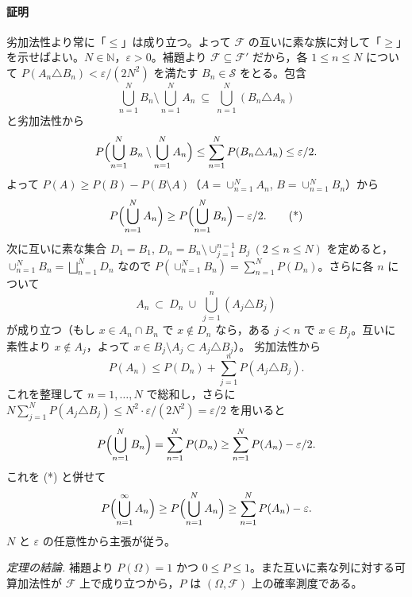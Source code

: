 \documentclass[uplatex,dvipdfmx,11pt,a4paper,openany]{bxjsbook}
\begin{document}
\paragraph{証明}
劣加法性より常に「\(\le\)」は成り立つ。よって \(\mathcal{F}\) の互いに素な族に対して「\(\ge\)」を示せばよい。\(N\in\mathbb{N}\)，\(\varepsilon>0\)。補題より \(\mathcal{F}\subseteq\mathcal{F}'\) だから，各 \(1\le n\le N\) について
                        \(P(A_n\triangle B_n)<\varepsilon/(2N^2)\) を満たす \(B_n\in\mathcal{S}\) をとる。包含
                        \[\bigcup_{n=1}^N B_n\setminus \bigcup_{n=1}^N A_n\ \subseteq\ \bigcup_{n=1}^N (B_n\triangle A_n)\]
                        と劣加法性から
                        \[P\Bigl(\bigcup_{n=1}^N B_n\setminus \bigcup_{n=1}^N A_n\Bigr)\le \sum_{n=1}^N P(B_n\triangle A_n)\le \varepsilon/2.\]
                        よって \(P(A)\ge P(B)-P(B\setminus A)\)（\(A=\cup_{n=1}^N A_n\), \(B=\cup_{n=1}^N B_n\)）から
                        \[P\Bigl(\bigcup_{n=1}^N A_n\Bigr)\ge P\Bigl(\bigcup_{n=1}^N B_n\Bigr)-\varepsilon/2.\tag{*}\]
                        次に互いに素な集合 \(D_1=B_1\), \(D_n=B_n\setminus \cup_{j=1}^{n-1}B_j\ (2\le n\le N)\) を定めると，\(\cup_{n=1}^N B_n=\bigsqcup_{n=1}^N D_n\) なので
                        \(P(\cup_{n=1}^N B_n)=\sum_{n=1}^N P(D_n)\)。さらに各 \(n\) について
                        \[A_n\ \subset\ D_n\ \cup\ \bigcup_{j=1}^{n}(A_j\triangle B_j)\]
                        が成り立つ（もし \(x\in A_n\cap B_n\) で \(x\notin D_n\) なら，ある \(j<n\) で \(x\in B_j\)。互いに素性より \(x\notin A_j\)，よって \(x\in B_j\setminus A_j\subset A_j\triangle B_j\)）。
                        劣加法性から
                        \[P(A_n)\le P(D_n)+\sum_{j=1}^{n}P(A_j\triangle B_j).\]
                        これを整理して \(n=1,\dots,N\) で総和し，さらに \(N\sum_{j=1}^N P(A_j\triangle B_j)\le N^2\cdot \varepsilon/(2N^2)=\varepsilon/2\) を用いると
                        \[P\Bigl(\bigcup_{n=1}^N B_n\Bigr)=\sum_{n=1}^N P(D_n)\ge \sum_{n=1}^N P(A_n)-\varepsilon/2.\]
                        これを (*) と併せて
                        \[P\Bigl(\bigcup_{n=1}^{\infty} A_n\Bigr)\ge P\Bigl(\bigcup_{n=1}^{N} A_n\Bigr)\ge \sum_{n=1}^{N} P(A_n)-\varepsilon.\]
                        \(N\) と \(\varepsilon\) の任意性から主張が従う。



\emph{定理の結論.} 補題より \(P(\Omega)=1\) かつ \(0\le P\le 1\)。また互いに素な列に対する可算加法性が \(\mathcal{F}\) 上で成り立つから，\(P\) は \((\Omega,\mathcal{F})\) 上の確率測度である。
\end{document}
